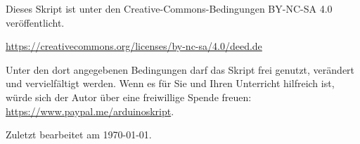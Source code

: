 Dieses Skript ist unter den Creative-Commons-Bedingungen BY-NC-SA 4.0 veröffentlicht.
	
\url{https://creativecommons.org/licenses/by-nc-sa/4.0/deed.de}

\medskip
Unter den dort angegebenen Bedingungen darf das Skript frei genutzt, verändert und vervielfältigt werden. Wenn es für Sie und Ihren Unterricht hilfreich ist, würde sich der Autor über eine freiwillige Spende freuen: \url{https://www.paypal.me/arduinoskript}.
	
\vspace{\baselineskip}
	
Zuletzt bearbeitet am \today.

\newpage
{}
\onehalfspacing

\tableofcontents
\clearpage

{}
\setcounter{page}{1}






	









